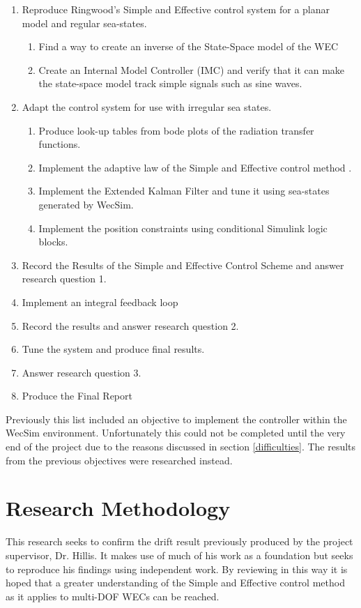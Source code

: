 \documentclass{report}
\begin{document}
\begin{enumerate}
\item{Reproduce Ringwood's Simple and Effective control system for a planar model and regular sea-states.}
	\begin{enumerate}
		\item{Find a way to create an inverse of the State-Space model of the WEC}
		\item{Create an Internal Model Controller (IMC) and verify that it can make the state-space model track simple 			signals such as sine waves.}
	\end{enumerate}
\item{Adapt the control system for use with irregular sea states.}
	\begin{enumerate}
		\item{Produce look-up tables from bode plots of the radiation transfer functions.}
		\item{Implement the adaptive law of the Simple and Effective control method \cite{ringwood}.}
		\item{Implement the Extended Kalman Filter and tune it using sea-states generated by WecSim.}
		\item{Implement the position constraints using conditional Simulink logic blocks.}
	\end{enumerate}

\item{Record the Results of the Simple and Effective Control Scheme and answer research question 1.}
\item{Implement an integral feedback loop}
\item{Record the results and answer research question 2.}
\item{Tune the system and produce final results.}
\item{Answer research question 3.}
\item{Produce the Final Report}
\end{enumerate}

Previously this list included an objective to implement the controller within the WecSim environment. Unfortunately this could not be completed until the very end of the project due to the reasons discussed in section \ref{difficulties}. The results from the previous objectives were researched instead.

\chapter{Research Methodology}
This research seeks to confirm the drift result previously produced by the project supervisor, Dr. Hillis. It makes use of much of his work as a foundation but seeks to reproduce his findings using independent work. By reviewing in this way it is hoped that a greater understanding of the Simple and Effective control method as it applies to multi-DOF WECs can be reached.
\end{document}
